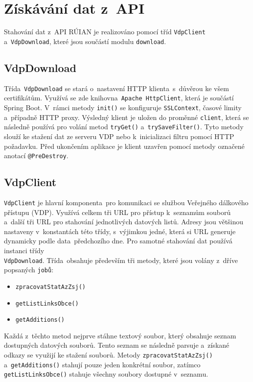 
\section{Získávání dat z~API}
Stahování dat z~API RÚIAN je realizováno pomocí tříd \texttt{VdpClient} a~\texttt{VdpDownload},  
které jsou součástí modulu \texttt{download}.

\subsection{VdpDownload}
Třída~\texttt{VdpDownload} se stará o~nastavení HTTP klienta~s~důvěrou ke všem certifikátům.  
Využívá se zde knihovna~\texttt{Apache HttpClient}, která je součástí Spring Boot.  
V~rámci metody \texttt{init()} se konfiguruje \texttt{SSLContext}, časové limity a~případně HTTP proxy.  
Výsledný klient je uložen do proměnné \texttt{client}, která se následně používá pro volání metod \texttt{tryGet()} a~\texttt{trySaveFilter()}.  
Tyto metody slouží ke stažení dat ze serveru VDP nebo k~inicializaci filtru pomocí HTTP požadavku.  
Před ukončením aplikace je klient uzavřen pomocí metody označené anotací \texttt{@PreDestroy}.

\subsection{VdpClient}
\texttt{VdpClient} je hlavní komponenta~pro komunikaci se službou Veřejného dálkového přístupu (VDP).  
Využívá celkem tři URL pro přístup k~seznamům souborů a~další tři URL pro stahování jednotlivých datových listů.  
Adresy jsou většinou nastaveny v~konstantách této třídy, s~výjimkou jedné, která si URL generuje dynamicky podle data~předchozího dne.  
Pro samotné stahování dat používá instanci třídy \\ \texttt{VdpDownload}.
Třída~obsahuje především tři metody, které jsou volány z~dříve popsaných \texttt{jobů}:
\begin{itemize}[itemsep=0pt]
    \item \texttt{zpracovatStatAzZsj()}
    \item \texttt{getListLinksObce()}
    \item \texttt{getAdditions()}
\end{itemize}

Každá z~těchto metod nejprve stáhne textový soubor, který obsahuje seznam dostupných datových souborů.  
Tento seznam se následně parsuje a~získané odkazy se využijí ke stažení souborů.  
Metody \texttt{zpracovatStatAzZsj()} a~\texttt{getAdditions()} stahují pouze jeden konkrétní soubor,  
zatímco \texttt{getListLinksObce()} stahuje všechny soubory dostupné v~seznamu.

